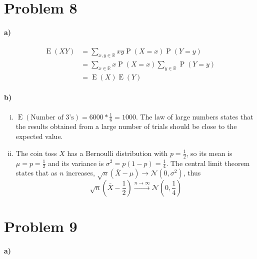 \documentclass[12pt]{article}
\begin{document}
\section*{Problem 8}

\paragraph{a)}

\begin{align*}
        \operatorname{E}(XY)&=\sum_{x,y\in\mathbb{R}} xy\operatorname{P}(X=x)\operatorname{P}(Y=y)\\
        &=\sum_{x\in\mathbb{R}}x\operatorname{P}(X=x)\sum_{y\in\mathbb{R}}\operatorname{P}(Y=y)\\
        &=\operatorname{E}(X)\operatorname{E}(Y)
\end{align*}

\paragraph{b)}

\begin{enumerate}[i)]
        \item \(\operatorname{E}(\text{Number of }3\text{'s})=6000*\frac{1}{6}=1000\). The law of large numbers states that the
                results obtained from a large number of trials should be close to the expected value.
        \item The coin toss \(X\) has a Bernoulli distribution with \(p=\frac{1}{2}\), so its mean is \(\mu=p=\frac{1}{2}\) and its 
                variance is \(\sigma^2=p(1-p)=\frac{1}{4}\). The central limit theorem states that as \(n\) increases,
                \(\sqrt{n}\left(\bar{X}-\mu\right)\rightarrow\mathcal{N}\left(0,\sigma^2\right)\), thus
                \[\sqrt{n}\left(\bar{X}-\frac{1}{2}\right)\overset{n\to\infty}{\longrightarrow}\mathcal{N}\left(0,\frac{1}{4}\right)\]
\end{enumerate}

\section*{Problem 9}

\paragraph{a)}
\end{document}
